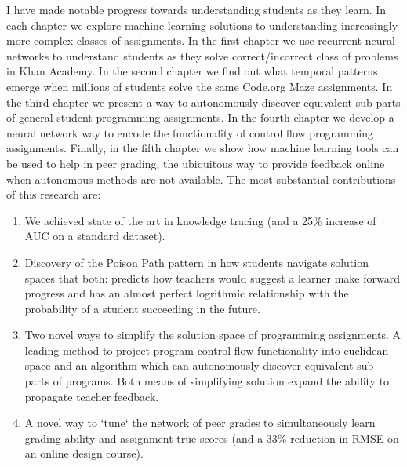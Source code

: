 I have made notable progress towards understanding students as they learn. In each chapter we explore machine learning solutions to understanding increasingly more complex classes of assignments. 
In the first chapter we use recurrent neural networks to understand students as they solve correct/incorrect class of problems in Khan Academy. In the second chapter we find out what temporal patterns emerge when millions of students solve the same Code.org Maze assignments. In the third chapter we present a way to autonomously discover equivalent sub-parts of general student programming assignments. In the fourth chapter we develop a neural network way to encode the functionality of control flow programming assignments. Finally, in the fifth chapter we show how machine learning tools can be used to help in peer grading, the ubiquitous way to provide feedback online when autonomous methods are not available. The most substantial contributions of this research are:
\begin{enumerate}
\item We achieved state of the art in knowledge tracing (and a 25\% increase of AUC on a standard dataset). 

\item Discovery of the Poison Path pattern in how students navigate solution spaces that both: predicts how teachers would suggest a learner make forward progress and has an almost perfect logrithmic relationship with the probability of a student succeeding in the future.

\item Two novel ways to simplify the solution space of programming assignments. A leading method to project program control flow functionality into euclidean space and an algorithm which can autonomously discover equivalent sub-parts of programs. Both means of simplifying solution expand the ability to propagate teacher feedback.

\item A novel way to `tune` the network of peer grades to simultaneously learn grading ability and assignment true scores (and a 33\% reduction in RMSE on an online design course).

\end{enumerate}

